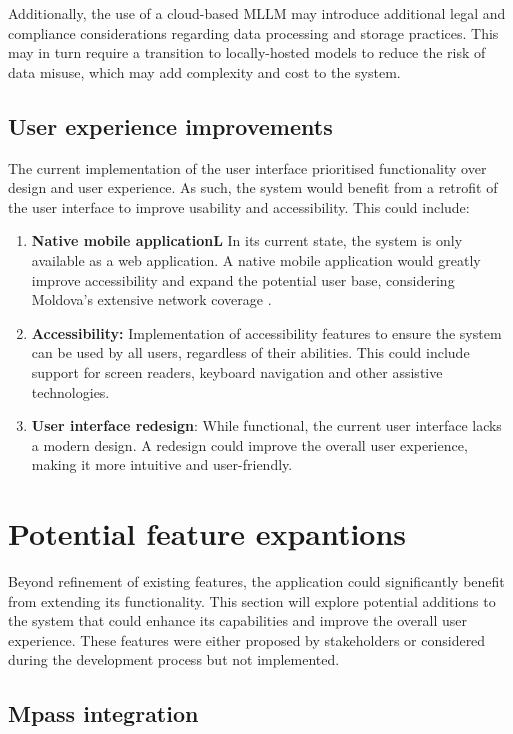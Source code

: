 Additionally, the use of a cloud-based MLLM may introduce additional legal and compliance considerations regarding data processing and storage practices. This may in turn require a transition to locally-hosted models to reduce the risk of data misuse, which may add complexity and cost to the system.

\subsection{User experience improvements}

The current implementation of the user interface prioritised functionality over design and user experience. As such, the system would benefit from a retrofit of the user interface to improve usability and accessibility. This could include:

\begin{enumerate}
    \item \textbf{Native mobile applicationL} In its current state, the system is only available as a web application. A native mobile application would greatly improve accessibility and expand the potential user base, considering Moldova's extensive network coverage \parencite{network}.
    \item \textbf{Accessibility:} Implementation of accessibility features to ensure the system can be used by all users, regardless of their abilities. This could include support for screen readers, keyboard navigation and other assistive technologies.
    \item \textbf{User interface redesign}: While functional, the current user interface lacks a modern design. A redesign could improve the overall user experience, making it more intuitive and user-friendly.
\end{enumerate}

\section{Potential feature expantions}\label{sec:future_work}

Beyond refinement of existing features, the application could significantly benefit from extending its functionality. This section will explore potential additions to the system that could enhance its capabilities and improve the overall user experience. These features were either proposed by stakeholders or considered during the development process but not implemented. 

\subsection{Mpass integration}

